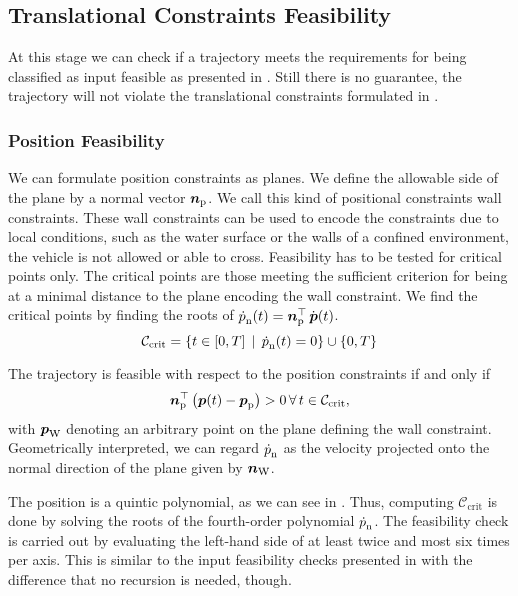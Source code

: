 \subsection{Translational Constraints Feasibility}
At this stage we can check if a trajectory meets the requirements for being classified as input feasible as presented in . Still there is no guarantee, the trajectory will not violate the translational constraints formulated in .

\subsubsection{Position Feasibility}
\label{sec:position-feasibility}
We can formulate position constraints as planes. We define the allowable side of the plane by a normal vector $\mbox{$\bm{n}$}_{\text{p}}$. We call this kind of positional constraints wall constraints. These wall constraints can be used to encode the constraints due to local conditions, such as the water surface or the walls of a confined environment, the vehicle is not allowed or able to cross. Feasibility has to be tested for critical points only. The critical points are those meeting the sufficient criterion for being at a minimal distance to the plane encoding the wall constraint. We find the critical points by finding the roots of $\mbox{$\dot{p}$}_{\text{n}}(t) = \mbox{$\bm{n}$}_{\text{p}}^\top \, \mbox{$\dot{\bm{p}}$}(t)$.
\begin{equation}
	\mathcal{C}_{\text{crit}} =
	\left\{
		t \in \left[ 0, T \right]
		\,\mid\, \mbox{$\dot{p}$}_{\text{n}}(t) = 0
	\right\}
	\cup
	\left\{0,T\right\}
\end{equation}

The trajectory is feasible with respect to the position constraints if and only if
\begin{equation}
	\label{eq:position-feasibility-criterion}
	\mbox{$\bm{n}$}_\text{p}^\top
	\left(
		\mbox{$\bm{p}$}(t) - \mbox{$\bm{p}$}_{\text{p}}
	\right)
	> 0
	\,\forall\, t \in \mathcal{C}_{\text{crit}}
	,
\end{equation}
with $\mbox{$\bm{p}$}_{\text{W}}$ denoting an arbitrary point on the plane defining the wall constraint. Geometrically interpreted, we can regard $\mbox{$\dot{p}$}_{\text{n}}$ as the velocity projected onto the normal direction of the plane given by $\mbox{$\bm{n}$}_{\text{W}}$.

The position is a quintic polynomial, as we can see in . Thus, computing $\mathcal{C}_{\text{crit}}$ is done by solving the roots of the fourth-order polynomial $\mbox{$\dot{p}$}_{\text{n}}$. The feasibility check is carried out by evaluating the left-hand side of  at least twice and most six times per axis. This is similar to the input feasibility checks presented in  with the difference that no recursion is needed, though.

